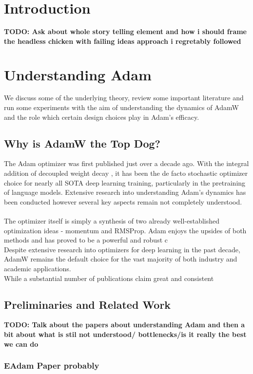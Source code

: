\documentclass[12pt]{book}
\newcommand{\todo}[1]{{\color{red}\bf{TODO: #1}}}
\begin{document}
\chapter{Introduction}
\todo{Ask about whole story telling element and how i should frame the headless chicken with failing ideas approach i regretably followed}



\chapter{Understanding Adam}
\label{chap: Understanding Adam}
We discuss some of the underlying theory, review some important literature and run some experiments with the aim of understanding the dynamics of AdamW and the role which certain design choices play in Adam's efficacy.

\section{Why is AdamW the Top Dog?}
The Adam optimizer \cite{kingma2017adammethodstochasticoptimization} was first published just over a decade ago. With the integral addition of decoupled weight decay \cite{loshchilov2019decoupledweightdecayregularization}, it has been the de facto stochastic optimizer choice for nearly all SOTA deep learning training, particularly in the pretraining of language models.  Extensive research into understanding Adam's dynamics has been conducted however several key aspects remain not completely understood. \\
\\
The optimizer itself is simply a synthesis of two already well-established optimization ideas - momentum and RMSProp. Adam enjoys the upsides of both methods and has proved to be a powerful and robust c\\
Despite extensive research into optimizers for deep learning in the past decade, AdamW remains the default choice for the vast majority of both industry and academic applications. \\
While a substantial number of publications claim great and consistent  
\section{Preliminaries and Related Work}
\todo{Talk about the papers about understanding Adam and then a bit about what is stil not understood/ bottlenecks/is it really the best we can do}
\subsection{EAdam Paper probably}
\end{document}
